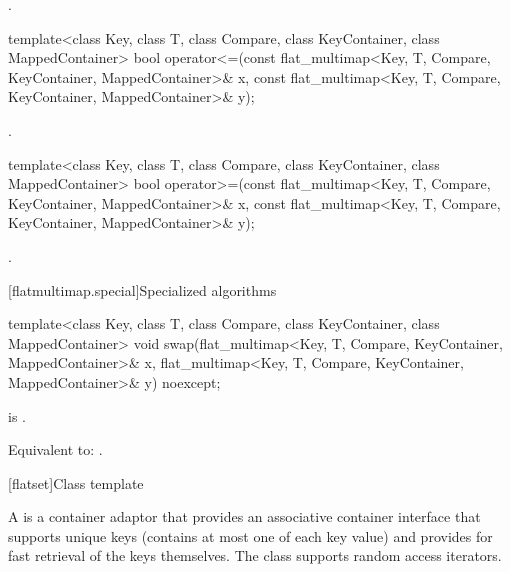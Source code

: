 \begin{codeblock}
\begin{codeblock}
\begin{codeblock}
\begin{addedblock}
\begin{itemdescr}
\pnum \returns {}.
\end{itemdescr}

%
\begin{itemdecl}
template<class Key, class T, class Compare, class KeyContainer, class MappedContainer>
  bool operator<=(const flat_multimap<Key, T, Compare, KeyContainer, MappedContainer>& x,
                  const flat_multimap<Key, T, Compare, KeyContainer, MappedContainer>& y);
\end{itemdecl}

\begin{itemdescr}
\pnum \returns {}.
\end{itemdescr}

%
\begin{itemdecl}
template<class Key, class T, class Compare, class KeyContainer, class MappedContainer>
  bool operator>=(const flat_multimap<Key, T, Compare, KeyContainer, MappedContainer>& x,
                  const flat_multimap<Key, T, Compare, KeyContainer, MappedContainer>& y);
\end{itemdecl}

\begin{itemdescr}
\pnum \returns {}.
\end{itemdescr}

[flatmultimap.special]{Specialized algorithms}

%
\begin{itemdecl}
template<class Key, class T, class Compare, class KeyContainer, class MappedContainer>
  void swap(flat_multimap<Key, T, Compare, KeyContainer, MappedContainer>& x,
            flat_multimap<Key, T, Compare, KeyContainer, MappedContainer>& y) noexcept;
\end{itemdecl}

\begin{itemdescr}
\pnum \constraints {}
is .

\pnum
\effects Equivalent to: .
\end{itemdescr}

[flatset]{Class template }

\pnum
{}%
A  is a container adaptor that provides an associative
container interface that supports unique keys (contains at most one of each
key value) and provides for fast retrieval of the keys themselves. The
 class supports random access iterators.


\end{addedblock}
\end{codeblock}
\end{codeblock}
\end{codeblock}
